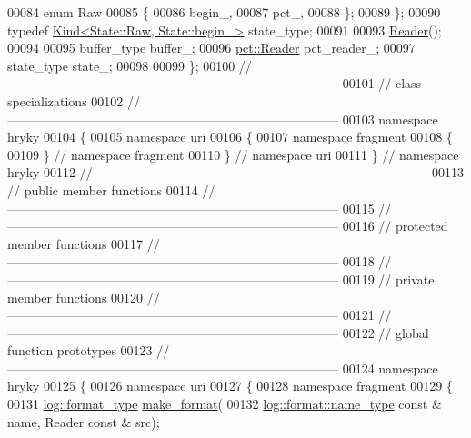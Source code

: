 \begin{DoxyCode}
00084         \textcolor{keyword}{enum} Raw
00085         \{
00086             begin\_,
00087             pct\_,
00088         \};
00089     \};
00090     \textcolor{keyword}{typedef} \hyperlink{classhryky_1_1_kind}{Kind<State::Raw, State::begin_>} state\_type;
00091 
00093     \hyperlink{classhryky_1_1uri_1_1_reader}{Reader}();
00094 
00095     buffer\_type buffer\_;
00096     \hyperlink{classhryky_1_1uri_1_1pct_1_1_reader}{pct::Reader} pct\_reader\_;
00097     state\_type  state\_;
00098 
00099 \};
00100 \textcolor{comment}{//
      ------------------------------------------------------------------------------}
00101 \textcolor{comment}{// class specializations}
00102 \textcolor{comment}{//
      ------------------------------------------------------------------------------}
00103 \textcolor{keyword}{namespace }hryky
00104 \{
00105 \textcolor{keyword}{namespace }uri
00106 \{
00107 \textcolor{keyword}{namespace }fragment
00108 \{
00109 \} \textcolor{comment}{// namespace fragment}
00110 \} \textcolor{comment}{// namespace uri}
00111 \} \textcolor{comment}{// namespace hryky}
00112 \textcolor{comment}{//
      ------------------------------------------------------------------------------}
00113 \textcolor{comment}{// public member functions}
00114 \textcolor{comment}{//
      ------------------------------------------------------------------------------}
00115 \textcolor{comment}{//
      ------------------------------------------------------------------------------}
00116 \textcolor{comment}{// protected member functions}
00117 \textcolor{comment}{//
      ------------------------------------------------------------------------------}
00118 \textcolor{comment}{//
      ------------------------------------------------------------------------------}
00119 \textcolor{comment}{// private member functions}
00120 \textcolor{comment}{//
      ------------------------------------------------------------------------------}
00121 \textcolor{comment}{//
      ------------------------------------------------------------------------------}
00122 \textcolor{comment}{// global function prototypes}
00123 \textcolor{comment}{//
      ------------------------------------------------------------------------------}
00124 \textcolor{keyword}{namespace }hryky
00125 \{
00126 \textcolor{keyword}{namespace }uri
00127 \{
00128 \textcolor{keyword}{namespace }fragment
00129 \{
00131     \hyperlink{namespacehryky_1_1log_ad50448c3f934f1eacd5c1bcffe8111e1}{log::format_type} \hyperlink{namespacehryky_1_1uri_a4c47d905f62ff90b7026c9f3f6544a9b}{make_format}(
00132         \hyperlink{namespacehryky_1_1log_1_1format_ab7408d1e2ed2d648dbf9bba69eb74288}{log::format::name_type} \textcolor{keyword}{const} & name, Reader \textcolor{keyword}{const} & src);

\end{DoxyCode}
